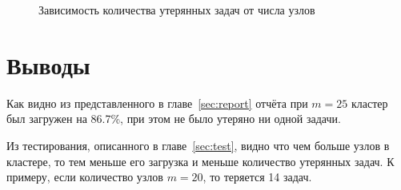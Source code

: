 \documentclass[12pt,a4paper,oneside]{extarticle}
\begin{document}
        \begin{figure}[h!]        
        \centering
        \caption{Зависимость количества утерянных задач от числа узлов}
        \label{pic:test2}
        \end{figure}

\section{Выводы}
    Как видно из представленного в главе~\ref{sec:report} отчёта при $m=25$ кластер был загружен на 86.7\%, при этом не было утеряно ни одной задачи.

    Из тестирования, описанного в главе~\ref{sec:test}, видно что чем больше узлов в кластере, то тем меньше его загрузка и меньше количество утерянных задач. К примеру, если количество узлов $m=20$, то теряется 14 задач.
    
\end{document}
